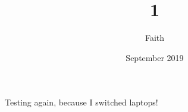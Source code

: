 \documentclass{article}
\title{1}
\author{Faith}
\date{September 2019}
\begin{document}
\maketitle
Testing again, because I switched laptops!
\end{document}
